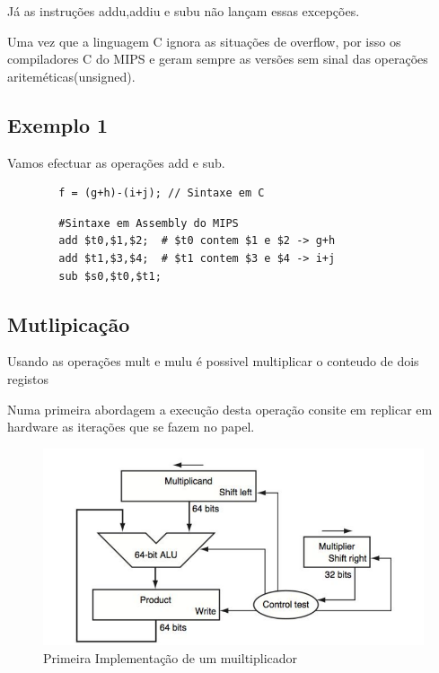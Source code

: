 \documentclass[10pt,a4paper]{book}
\begin{document}
			Já as instruções addu,addiu e subu não lançam essas excepções.

			Uma vez que a linguagem C ignora as situações de overflow, por isso os compiladores C do MIPS e geram sempre as versões sem sinal das operações ariteméticas(unsigned).

	    \subsection{Exemplo 1}
	     Vamos efectuar as operações add e sub.
	      \begin{lstlisting}
		f = (g+h)-(i+j); // Sintaxe em C
	      \end{lstlisting}

	     \begin{lstlisting}
		#Sintaxe em Assembly do MIPS
		add $t0,$1,$2;  # $t0 contem $1 e $2 -> g+h
		add $t1,$3,$4;  # $t1 contem $3 e $4 -> i+j
		sub $s0,$t0,$t1;

	     \end{lstlisting}

	     \subsection{Mutlipicação}

	     Usando as operações mult e mulu é possivel multiplicar o conteudo de dois registos

	     Numa primeira abordagem a execução desta operação consite em replicar em hardware as iterações que se fazem no papel.

   			\begin{figure}[htp]
			    \centering
			    \includegraphics[scale=0.5]{mul1.png}
			    \caption{Primeira Implementação de um muiltiplicador}
			    \label{mul1}
			\end{figure}
\end{document}
